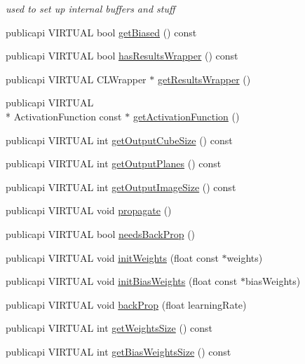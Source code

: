 \begin{DoxyCompactItemize}
\begin{DoxyCompactList}\small\item\em used to set up internal buffers and stuff \end{DoxyCompactList}\item 
publicapi V\-I\-R\-T\-U\-A\-L bool \hyperlink{classLayer_ab79827404ddcc0748363ee82f80f5500}{get\-Biased} () const 
\item 
publicapi V\-I\-R\-T\-U\-A\-L bool \hyperlink{classLayer_a6266a51eb760e512987aa8370d5c8c55}{has\-Results\-Wrapper} () const 
\item 
publicapi V\-I\-R\-T\-U\-A\-L C\-L\-Wrapper $\ast$ \hyperlink{classLayer_abe0fe88be13188358312b129deb688ac}{get\-Results\-Wrapper} ()
\item 
publicapi V\-I\-R\-T\-U\-A\-L \\*
Activation\-Function const $\ast$ \hyperlink{classLayer_a0ba9ca126aa2618018823555fb3c9737}{get\-Activation\-Function} ()
\item 
publicapi V\-I\-R\-T\-U\-A\-L int \hyperlink{classLayer_a4d3aab33b1ab977927e7e7358981b572}{get\-Output\-Cube\-Size} () const 
\item 
publicapi V\-I\-R\-T\-U\-A\-L int \hyperlink{classLayer_aca28b88a9ebe40c23fbc72f934980f65}{get\-Output\-Planes} () const 
\item 
publicapi V\-I\-R\-T\-U\-A\-L int \hyperlink{classLayer_ad7ab6a2cb6c247a3f076189b6b66e855}{get\-Output\-Image\-Size} () const 
\item 
publicapi V\-I\-R\-T\-U\-A\-L void \hyperlink{classLayer_a2e03b77adb5127c11f45a3e5927748ad}{propagate} ()
\item 
publicapi V\-I\-R\-T\-U\-A\-L bool \hyperlink{classLayer_a6b870d8f1928d7a054b133a80d5e50d1}{needs\-Back\-Prop} ()
\item 
publicapi V\-I\-R\-T\-U\-A\-L void \hyperlink{classLayer_a582c2a35976d9aaf050a8619c5a630da}{init\-Weights} (float const $\ast$weights)
\item 
publicapi V\-I\-R\-T\-U\-A\-L void \hyperlink{classLayer_acda45ef7133827f399ac682ff409c311}{init\-Bias\-Weights} (float const $\ast$bias\-Weights)
\item 
publicapi V\-I\-R\-T\-U\-A\-L void \hyperlink{classLayer_a74464720a6019ee22eb57c4f876fb812}{back\-Prop} (float learning\-Rate)
\item 
publicapi V\-I\-R\-T\-U\-A\-L int \hyperlink{classLayer_a96234c95cad95b60c44ed0af11b712ba}{get\-Weights\-Size} () const 
\item 
publicapi V\-I\-R\-T\-U\-A\-L int \hyperlink{classLayer_af45c20c2d438d7d17f779e573ba6f784}{get\-Bias\-Weights\-Size} () const 

\end{DoxyCompactItemize}
